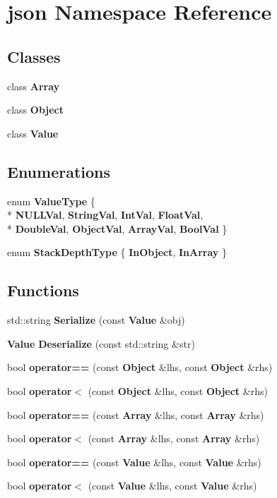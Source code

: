 \section{json Namespace Reference}
\label{namespacejson}
\subsection*{Classes}
\begin{DoxyCompactItemize}
\item 
class {\bf Array}
\item 
class {\bf Object}
\item 
class {\bf Value}
\end{DoxyCompactItemize}
\subsection*{Enumerations}
\begin{DoxyCompactItemize}
\item 
enum {\bf Value\+Type} \{ \\*
{\bf N\+U\+L\+L\+Val}, 
{\bf String\+Val}, 
{\bf Int\+Val}, 
{\bf Float\+Val}, 
\\*
{\bf Double\+Val}, 
{\bf Object\+Val}, 
{\bf Array\+Val}, 
{\bf Bool\+Val}
 \}
\item 
enum {\bf Stack\+Depth\+Type} \{ {\bf In\+Object}, 
{\bf In\+Array}
 \}
\end{DoxyCompactItemize}
\subsection*{Functions}
\begin{DoxyCompactItemize}
\item 
std\+::string {\bf Serialize} (const {\bf Value} \&obj)
\item 
{\bf Value} {\bf Deserialize} (const std\+::string \&str)
\item 
bool {\bf operator==} (const {\bf Object} \&lhs, const {\bf Object} \&rhs)
\item 
bool {\bf operator$<$} (const {\bf Object} \&lhs, const {\bf Object} \&rhs)
\item 
bool {\bf operator==} (const {\bf Array} \&lhs, const {\bf Array} \&rhs)
\item 
bool {\bf operator$<$} (const {\bf Array} \&lhs, const {\bf Array} \&rhs)
\item 
bool {\bf operator==} (const {\bf Value} \&lhs, const {\bf Value} \&rhs)
\item 
bool {\bf operator$<$} (const {\bf Value} \&lhs, const {\bf Value} \&rhs)
\end{DoxyCompactItemize}


